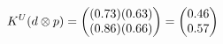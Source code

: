 \documentclass[preview]{standalone}
\begin{document}
\begin{align*}
\special{dvisvgm:raw <g id='unique000'>}K^U(d \otimes p) = \begin{pmatrix} (0.73)(0.63) \\ (0.86)(0.66) \end{pmatrix} = \begin{pmatrix} 0.46 \\ 0.57 \end{pmatrix}\special{dvisvgm:raw </g>}
\end{align*}
\end{document}
